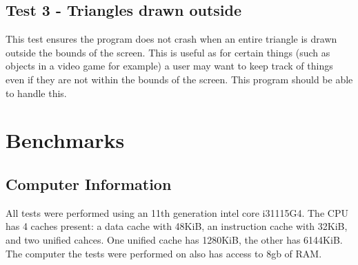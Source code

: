 \documentclass[
	a4paper, %
	10pt, %
]{CSUniSchoolLabReport}
\begin{document}
\subsection*{Test 3 {-} Triangles drawn outside}
This test ensures the program does not crash when an entire triangle is drawn outside the bounds of 
the screen. This is useful as for certain things (such as objects in a video game for example) a user 
may want to keep track of things even if they are not within the bounds of the screen. This program 
should be able to handle this.

\section{Benchmarks}
\subsection{Computer Information}
\begin{flushleft}
	All tests were performed using an 11th generation intel core i3\-1115G4.
	The CPU has 4 caches present: a data cache with 48KiB, an instruction cache with 32KiB,
	and two unified cahces. One unified cache has 1280KiB, the other has 6144KiB.
	The computer the tests were performed on also has access to 8gb of RAM.
\end{flushleft}
\end{document}
